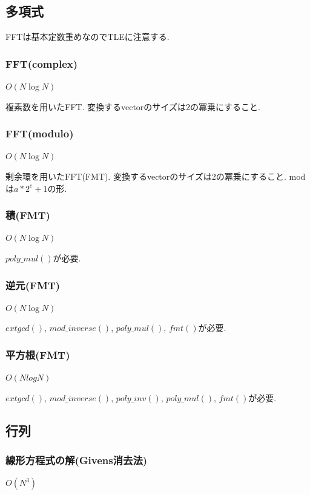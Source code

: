 \documentclass[9pt,twocolumn,a4paper,landscape]{extarticle}
\begin{document}
\subsection{多項式}
FFTは基本定数重めなのでTLEに注意する.
\subsubsection{FFT(complex)}
$O(N \log N)$\par
複素数を用いたFFT. 変換するvectorのサイズは2の冪乗にすること.


\subsubsection{FFT(modulo)}
$O(N \log N)$\par
剰余環を用いたFFT(FMT). 変換するvectorのサイズは2の冪乗にすること. modは$a*2^e+1$の形.\\


\subsubsection{積(FMT)}
$O(N \log N)$\par
$poly\_mul()$が必要.


\subsubsection{逆元(FMT)}
$O(N \log N)$\par
$extgcd()$, $mod\_inverse()$, $poly\_mul()$, $fmt()$が必要.


\subsubsection{平方根(FMT)}
$O(N log N)$\par
$extgcd()$, $mod\_inverse()$, $poly\_inv()$, $poly\_mul()$, $fmt()$が必要.



\subsection{行列}


\subsubsection{線形方程式の解(Givens消去法)}
$O(N^3)$

\end{document}
